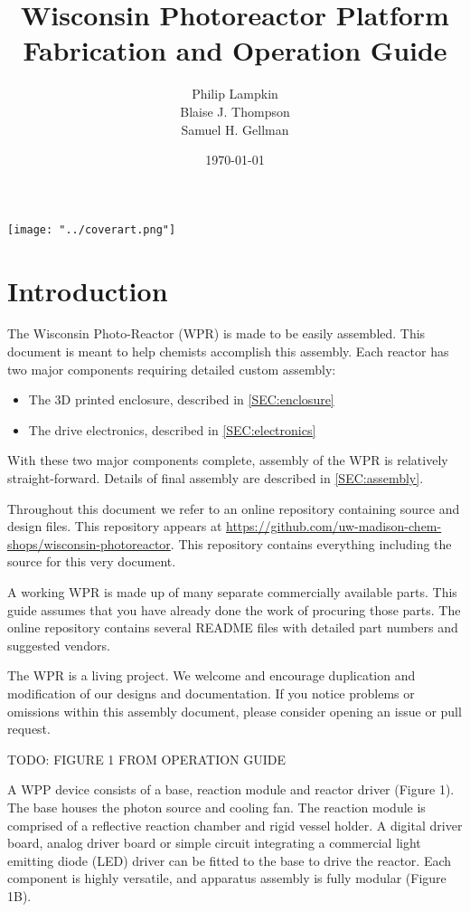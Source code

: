 \documentclass[11pt]{article}
\title{Wisconsin Photoreactor Platform\\Fabrication and Operation Guide}
\author{
  Philip Lampkin \\
  Blaise J. Thompson \\
  Samuel H. Gellman
  }
\date{\today}
\let\stdsection\section
\renewcommand\section{\clearpage\stdsection}
\begin{document}
\maketitle

\texttt{[image: "../coverart.png"]}

\tableofcontents

\section{Introduction}

The Wisconsin Photo-Reactor (WPR) is made to be easily assembled.
This document is meant to help chemists accomplish this assembly.
Each reactor has two major components requiring detailed custom assembly:

\begin{itemize}
  \item The 3D printed enclosure, described in \autoref{SEC:enclosure}
  \item The drive electronics, described in \autoref{SEC:electronics}
\end{itemize}

With these two major components complete, assembly of the WPR is relatively straight-forward.
Details of final assembly are described in \autoref{SEC:assembly}.

Throughout this document we refer to an online repository containing source and design files.
This repository appears at \url{https://github.com/uw-madison-chem-shops/wisconsin-photoreactor}.
This repository contains everything including the source for this very document.

A working WPR is made up of many separate commercially available parts.
This guide assumes that you have already done the work of procuring those parts.
The online repository contains several README files with detailed part numbers and suggested vendors.

The WPR is a living project.
We welcome and encourage duplication and modification of our designs and documentation.
If you notice problems or omissions within this assembly document, please consider opening an issue or pull request.

TODO: FIGURE 1 FROM OPERATION GUIDE

A WPP device consists of a base, reaction module and reactor driver (Figure 1).
The base houses the photon source and cooling fan.
The reaction module is comprised of a reflective reaction chamber and rigid vessel holder.
A digital driver board, analog driver board or simple circuit integrating a commercial light emitting diode (LED) driver can be fitted to the base to drive the reactor.
Each component is highly versatile, and apparatus assembly is fully modular (Figure 1B).
\end{document}
